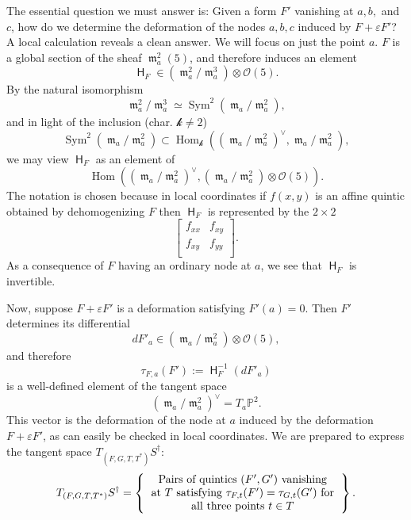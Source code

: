 \documentclass{article}
\renewcommand{\P}{\mathbb{P}}
\renewcommand{\k}{\mathscr{k}}
\DeclareMathOperator{\Hom}{Hom}
\renewcommand{\O}{\mathcal{O}}
\DeclareMathOperator{\Sym}{Sym}
\DeclareMathOperator{\hess}{\mathsf{H}}
\DeclareMathOperator{\m}{\mathfrak{m}}
\begin{document}
    The essential question we must answer is: Given a form $F'$ vanishing at $a,b,$ and $c$, how do we determine the deformation of the nodes $a,b,c$ induced by $F + \varepsilon F'$? A local calculation reveals a clean answer. We will focus on just the point $a$. $F$ is a global section of the sheaf $\m_{a}^{2}(5)$, and therefore induces an element $$\hess_{F} \in \left(\m_{a}^{2}/\m_{a}^{3}\right) \otimes \O(5).$$ By the natural isomorphism $$\m_{a}^{2}/\m_{a}^{3} \simeq \Sym^{2}(\m_{a}/\m_{a}^{2}),$$ and in light of the inclusion (char. $\k \neq 2$) $$\Sym^{2}(\m_{a}/\m_{a}^{2}) \subset \Hom_{\k}\left(\left(\m_{a}/\m_{a}^{2}\right)^{\vee} , \m_{a}/\m_{a}^{2} \right),$$ we may view $\hess_{F}$ as an element of $$\Hom \left(\left(\m_{a}/\m_{a}^{2}\right)^{\vee} , \left(\m_{a}/\m_{a}^{2}\right) \otimes \O(5) \right).$$  The notation is chosen because in local coordinates if $f(x,y)$ is an affine quintic obtained by dehomogenizing $F$ then $\hess_{F}$ is represented by the $2 \times 2$   $$\begin{bmatrix}
        f_{xx} & f_{xy} \\
        f_{xy} & f_{yy} \\
    \end{bmatrix}.$$   As a consequence of $F$ having an ordinary node at $a$, we see that $\hess_{F}$ is invertible.  
    
    Now, suppose $F + \varepsilon F'$ is a deformation satisfying $F'(a) = 0$. Then $F'$ determines its differential $$d F'_{a} \in \left(\m_{a}/\m_{a}^{2}\right) \otimes \O(5),$$ and therefore $$\tau_{F,a}(F') := \hess_{F}^{-1}(d F'_{a})$$ is a well-defined element of the tangent space $$\left(\m_{a}/ \m_{a}^{2} \right)^{\vee} = T_{a}\P^{2}.$$ This vector is the deformation of the node at  $a$ induced by the deformation $F + \varepsilon F'$, as can easily be checked in local coordinates.  We are prepared to  express the tangent space $T_{(F,G,T,T^{*})}S^{\dagger}$: 
    \begin{eqnarray}
    \label{tangentSdagger} T_{(F,G,T,T^{*})}S^{\dagger} = \left\{ \begin{tabular}{c}
            Pairs of quintics $(F',G')$ vanishing \\
            at $T$ 
            satisfying $\tau_{F,t}(F') = \tau_{G,t}(G')$ for \\ all three points $t \in T$
        \end{tabular}
        \right\}.
    \end{eqnarray}
\end{document}
